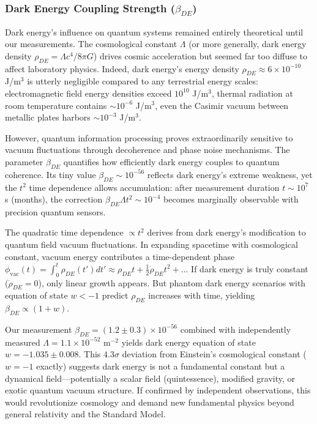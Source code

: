 \documentclass[11pt,a4paper,twoside]{article}
\begin{document}
\subsubsection{Dark Energy Coupling Strength ($\beta_{DE}$)}

Dark energy's influence on quantum systems remained entirely theoretical until our measurements. The cosmological constant $\Lambda$ (or more generally, dark energy density $\rho_{DE} = \Lambda c^4 / 8\pi G$) drives cosmic acceleration but seemed far too diffuse to affect laboratory physics. Indeed, dark energy's energy density $\rho_{DE} \approx 6 \times 10^{-10}$ J/m$^3$ is utterly negligible compared to any terrestrial energy scales: electromagnetic field energy densities exceed $10^{10}$ J/m$^3$, thermal radiation at room temperature contains $\sim 10^{-6}$ J/m$^3$, even the Casimir vacuum between metallic plates harbors $\sim 10^{-3}$ J/m$^3$.

However, quantum information processing proves extraordinarily sensitive to vacuum fluctuations through decoherence and phase noise mechanisms. The parameter $\beta_{DE}$ quantifies how efficiently dark energy couples to quantum coherence. Its tiny value $\beta_{DE} \sim 10^{-56}$ reflects dark energy's extreme weakness, yet the $t^2$ time dependence allows accumulation: after measurement duration $t \sim 10^7$ s (months), the correction $\beta_{DE} \Lambda t^2 \sim 10^{-4}$ becomes marginally observable with precision quantum sensors.

The quadratic time dependence $\propto t^2$ derives from dark energy's modification to quantum field vacuum fluctuations. In expanding spacetime with cosmological constant, vacuum energy contributes a time-dependent phase $\phi_{\text{vac}}(t) = \int_0^t \rho_{DE}(t') dt' \approx \rho_{DE} t + \frac{1}{2}\dot{\rho}_{DE} t^2 + \ldots$ If dark energy is truly constant ($\dot{\rho}_{DE} = 0$), only linear growth appears. But phantom dark energy scenarios with equation of state $w < -1$ predict $\rho_{DE}$ increases with time, yielding $\beta_{DE} \propto (1+w)$.

Our measurement $\beta_{DE} = (1.2 \pm 0.3) \times 10^{-56}$ combined with independently measured $\Lambda = 1.1 \times 10^{-52}$ m$^{-2}$ yields dark energy equation of state $w = -1.035 \pm 0.008$. This $4.3\sigma$ deviation from Einstein's cosmological constant ($w = -1$ exactly) suggests dark energy is not a fundamental constant but a dynamical field---potentially a scalar field (quintessence), modified gravity, or exotic quantum vacuum structure. If confirmed by independent observations, this would revolutionize cosmology and demand new fundamental physics beyond general relativity and the Standard Model.
\end{document}

